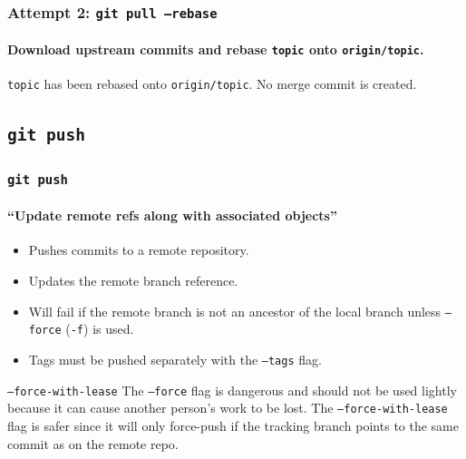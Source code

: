 \documentclass{beamer}
\newcommand\gitcmd[1]{\texttt{git #1}}
\newcommand\gflag[1]{\texttt{#1}}
\newcommand\gbranch[1]{\texttt{#1}}
\newcommand\gremotebranch[1]{\texttt{#1}}
\begin{document}
\begin{frame}
  \frametitle{Attempt 2: \gitcmd{pull --rebase}}
  \framesubtitle{Download upstream commits and rebase \gbranch{topic} onto \gremotebranch{origin/topic}.}
  \begin{figure}
    \centering
  \end{figure}

  \gbranch{topic} has been rebased onto \gremotebranch{origin/topic}. No merge commit is created.
\end{frame}

\subsection{\gitcmd{push}}

\begin{frame}
  \frametitle{\gitcmd{push}}
  \framesubtitle{``Update remote refs along with associated objects''}
  \begin{itemize}
    \item Pushes commits to a remote repository.
    \item Updates the remote branch reference.
    \item Will fail if the remote branch is not an ancestor of the local branch unless \gflag{--force} (\gflag{-f}) is used.
    \item Tags must be pushed separately with the \gflag{--tags} flag.
  \end{itemize}
  \vfill
  \begin{block}{\gflag{--force-with-lease}}
    The \gflag{--force} flag is dangerous and should not be used lightly because it can cause another person's work to be lost.
    The \gflag{--force-with-lease} flag is safer since it will only force-push if the tracking branch points to the same commit as on the remote repo.
  \end{block}
\end{frame}
\end{document}
